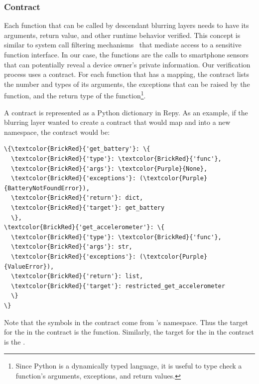 \subsubsection{Contract}

%
Each function that can be called by descendant blurring
layers needs to have its arguments, return value, and 
other runtime behavior verified. This concept is similar to system call filtering
mechanisms~\cite{acharya2000mapbox, fraser2000hardening} 
that mediate access to a sensitive function interface. In our case, 
the functions are the calls to smartphone sensors that 
can potentially reveal a device owner's private information. Our
verification process uses a contract. For each function that has a 
mapping, the contract lists the number 
and types of its arguments, the exceptions that can be raised 
by the function, and the return type of the function\footnote{\scriptsize 
Since Python is a dynamically typed language, it is useful to type check 
a function's arguments, exceptions, and return values.}.

A contract is represented as a Python dictionary in Repy. As an example, if 
the blurring layer  wanted to create a contract that would map
 and  into 
a new namespace, the contract would be: 

\begin{Verbatim}
\{\textcolor{BrickRed}{'get_battery'}: \{
  \textcolor{BrickRed}{'type'}: \textcolor{BrickRed}{'func'},
  \textcolor{BrickRed}{'args'}: \textcolor{Purple}{None}, 
  \textcolor{BrickRed}{'exceptions'}: (\textcolor{Purple}{BatteryNotFoundError}), 
  \textcolor{BrickRed}{'return'}: dict,
  \textcolor{BrickRed}{'target'}: get_battery
  \}, 
\textcolor{BrickRed}{'get_accelerometer'}: \{
  \textcolor{BrickRed}{'type'}: \textcolor{BrickRed}{'func'},
  \textcolor{BrickRed}{'args'}: str, 
  \textcolor{BrickRed}{'exceptions'}: (\textcolor{Purple}{ValueError}), 
  \textcolor{BrickRed}{'return'}: list,
  \textcolor{BrickRed}{'target'}: restricted_get_accelerometer
  \}
\}
\end{Verbatim} 

Note that the symbols in the contract come from 's 
namespace. Thus the target for the  in the 
contract is the  function. Similarly, the 
target for the  in the contract is the 
.

